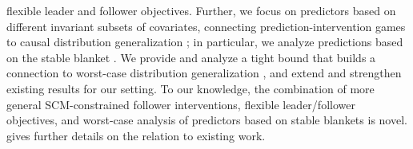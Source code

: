 flexible leader and follower objectives. Further, we focus on predictors based on different invariant subsets of covariates, 
connecting
prediction-intervention games to causal distribution
generalization \citep{petersCausalInferenceUsing2015,rojas-carullaInvariantModelsCausal2018, christiansenCausalFrameworkDistribution2021};
in particular, we analyze predictions based on the stable blanket
\citep{pfisterStabilizingVariableSelection2021}. 
We provide and analyze a tight bound that builds a connection to worst-case distribution generalization \citep{Kuhn_Shafiee_Wiesemann_2025, sagawa_groupDRO, freni2025maximum},
and
extend and strengthen existing results for our setting. To our knowledge, the combination of more general SCM-constrained follower interventions, flexible leader/follower objectives, and worst-case analysis of predictors based on stable blankets is novel.  gives further details on the relation to existing work.



